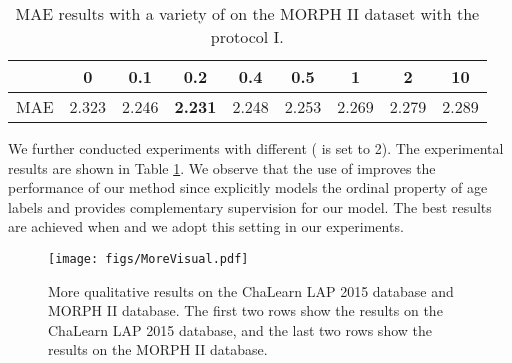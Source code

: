 \documentclass[journal,twoside]{IEEEtran}
\begin{document}
\begin{table}[t]
\caption{MAE results with a variety of  on the MORPH II dataset with the protocol I.}
\label{table:lambda}
\renewcommand\tabcolsep{5pt}
\centering
\begin{tabular}{l|cccccccc}
\toprule
 & 0 & 0.1  &  0.2 & 0.4 & 0.5 & 1 & 2 &10    \\
\midrule
MAE & 2.323 & 2.246 & \textbf{2.231} & 2.248 &  2.253 & 2.269 & 2.279 & 2.289 \\
\bottomrule
\end{tabular}
\end{table}






We further conducted experiments with different  ( is set to 2). The experimental results are shown in Table \ref{table:lambda}. We observe that the use of  improves the performance of our method since  explicitly models the ordinal property of age labels and provides complementary supervision for our model. The best results are achieved when  and we adopt this setting in our experiments.






\begin{figure*}[t]
  \begin{center}
     \texttt{[image: figs/MoreVisual.pdf]}
  \end{center}
     \caption{More qualitative results on the ChaLearn LAP 2015 database and MORPH II database. The first two rows show the results on the ChaLearn LAP 2015 database, and the last two rows show the results on the MORPH II database.}
  \label{fig:morevisual}
\end{figure*}
\end{document}
